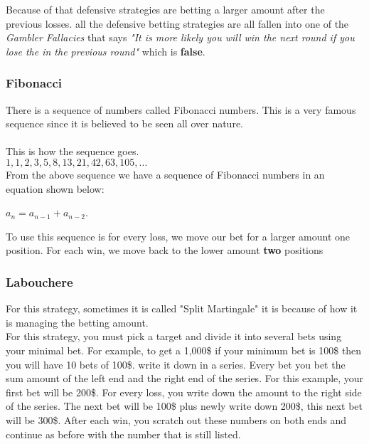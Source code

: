 \documentclass{article}
\begin{document}
Because of that defensive strategies are betting a larger amount after the previous losses.  all the defensive betting strategies are all fallen into one of the \emph{Gambler Fallacies} that says \emph{"It is more likely you will win the next round if you lose the in the previous round"} which is \textbf{false}. 

\subsubsection{Fibonacci}

There is a sequence of numbers called Fibonacci numbers.  This is a very famous sequence since it is believed to be seen all over nature.\\
\\
This is how the sequence goes.\\

$1, 1, 2, 3, 5, 8, 13, 21, 42, 63, 105, ...$\\

From the above sequence we have a sequence of Fibonacci numbers in an equation shown below:\par
\begin{center}
 $a_n=a_{n-1}+a_{n-2}$.  \\
\end{center}

To use this sequence is for every loss, we move our bet for a larger amount one position.  For each win, we move back to the lower amount \textbf{two} positions\\

\subsubsection{Labouchere}
For this strategy, sometimes it is called "Split Martingale" it is because of how it is managing the betting amount.\\

For this strategy, you must pick a target and divide it into several bets using your minimal bet.  For example, to get a 1,000\$ if your minimum bet is 100\$ then you will have 10 bets of 100\$.  write it down in a series. Every bet you bet the sum amount of the left end and the right end of the series.  For this example, your first bet will be 200\$.  For every loss, you write down the amount to the right side of the series. The next bet will be 100\$ plus newly write down 200\$, this next bet will be 300\$. After each win, you scratch out these numbers on both ends and continue as before with the number that is still listed.\\
\end{document}
